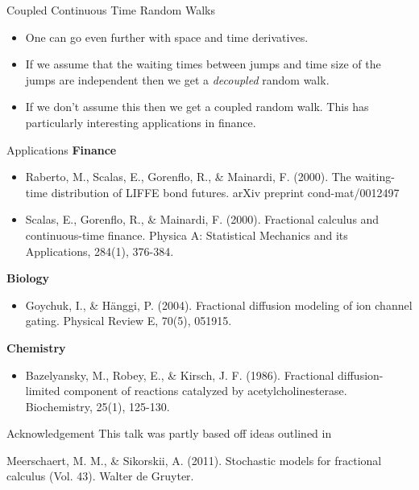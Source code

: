 \documentclass[pdf]{beamer}
\begin{document}
\begin{frame}{Coupled Continuous Time Random Walks}
    \begin{itemize}
        \item One can go even further with space and time derivatives. 
        \item If we assume that the waiting times between jumps and time size of the jumps are independent then we get a \emph{decoupled} random walk.
        \item If we don't assume this then we get a coupled random walk. This has particularly interesting applications in finance.
    \end{itemize}
\end{frame}

\begin{frame}{Applications}
    \textbf{Finance}
    \begin{itemize}
        \item Raberto, M., Scalas, E., Gorenflo, R., \& Mainardi, F. (2000). The waiting-time distribution of LIFFE bond futures. arXiv preprint cond-mat/0012497
        \item Scalas, E., Gorenflo, R., \& Mainardi, F. (2000). Fractional calculus and continuous-time finance. Physica A: Statistical Mechanics and its Applications, 284(1), 376-384.
    \end{itemize}
    \textbf{Biology}
    \begin{itemize}
        \item Goychuk, I., \& Hänggi, P. (2004). Fractional diffusion modeling of ion channel gating. Physical Review E, 70(5), 051915.
    \end{itemize}
    \textbf{Chemistry}
    \begin{itemize}
        \item Bazelyansky, M., Robey, E., \& Kirsch, J. F. (1986). Fractional diffusion-limited component of reactions catalyzed by acetylcholinesterase. Biochemistry, 25(1), 125-130.
    \end{itemize}
\end{frame}

\begin{frame}{Acknowledgement}
    This talk was partly based off ideas outlined in
    
    Meerschaert, M. M., \& Sikorskii, A. (2011). Stochastic models for fractional calculus (Vol. 43). Walter de Gruyter.
\end{frame}
\end{document}
